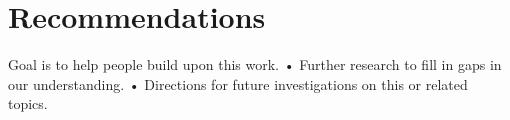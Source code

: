 \chapter{Recommendations}
Goal is to help people build upon this work.
• Further research to fill in gaps in our understanding.
• Directions for future investigations on this or related topics.